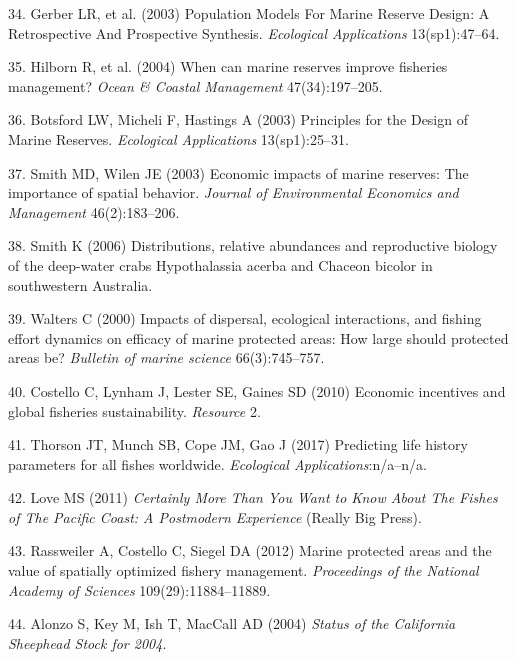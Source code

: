 \documentclass[9pt,twocolumn,twoside,lineno]{pnas-new}
\begin{document}
\leavevmode\hypertarget{ref-gerber2003}{}%
34. Gerber LR, et al. (2003) Population Models For Marine Reserve
Design: A Retrospective And Prospective Synthesis. \emph{Ecological
Applications} 13(sp1):47--64.

\leavevmode\hypertarget{ref-hilborn2004a}{}%
35. Hilborn R, et al. (2004) When can marine reserves improve fisheries
management? \emph{Ocean \& Coastal Management} 47(34):197--205.

\leavevmode\hypertarget{ref-botsford2003}{}%
36. Botsford LW, Micheli F, Hastings A (2003) Principles for the Design
of Marine Reserves. \emph{Ecological Applications} 13(sp1):25--31.

\leavevmode\hypertarget{ref-smith2003}{}%
37. Smith MD, Wilen JE (2003) Economic impacts of marine reserves: The
importance of spatial behavior. \emph{Journal of Environmental Economics
and Management} 46(2):183--206.

\leavevmode\hypertarget{ref-smith2006}{}%
38. Smith K (2006) Distributions, relative abundances and reproductive
biology of the deep-water crabs Hypothalassia acerba and Chaceon bicolor
in southwestern Australia.

\leavevmode\hypertarget{ref-walters2000}{}%
39. Walters C (2000) Impacts of dispersal, ecological interactions, and
fishing effort dynamics on efficacy of marine protected areas: How large
should protected areas be? \emph{Bulletin of marine science}
66(3):745--757.

\leavevmode\hypertarget{ref-costello2010}{}%
40. Costello C, Lynham J, Lester SE, Gaines SD (2010) Economic
incentives and global fisheries sustainability. \emph{Resource} 2.

\leavevmode\hypertarget{ref-thorson2017c}{}%
41. Thorson JT, Munch SB, Cope JM, Gao J (2017) Predicting life history
parameters for all fishes worldwide. \emph{Ecological
Applications}:n/a--n/a.

\leavevmode\hypertarget{ref-love2011}{}%
42. Love MS (2011) \emph{Certainly More Than You Want to Know About The
Fishes of The Pacific Coast: A Postmodern Experience} (Really Big
Press).

\leavevmode\hypertarget{ref-rassweiler2012}{}%
43. Rassweiler A, Costello C, Siegel DA (2012) Marine protected areas
and the value of spatially optimized fishery management.
\emph{Proceedings of the National Academy of Sciences}
109(29):11884--11889.

\leavevmode\hypertarget{ref-alonzo2004}{}%
44. Alonzo S, Key M, Ish T, MacCall AD (2004) \emph{Status of the
California Sheephead Stock for 2004}.
\end{document}

